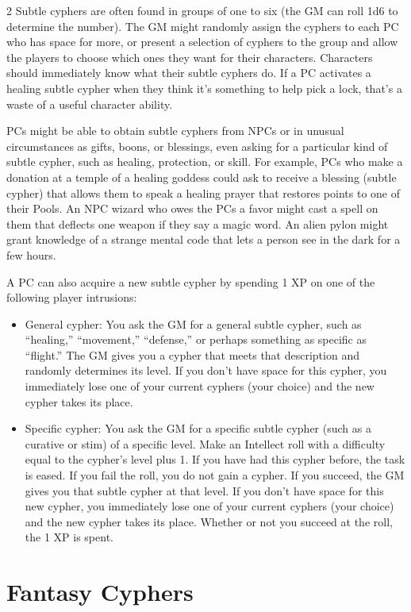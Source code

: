 \begin{multicols}{2}
Subtle cyphers are often found in groups of one to six (the GM can roll 1d6 to determine the number). The GM might randomly assign the cyphers to each PC who has space for more, or present a selection of cyphers to the group and allow the players to choose which ones they want for their characters. Characters should immediately know what their subtle cyphers do. If a PC activates a healing subtle cypher when they think it’s something to help pick a lock, that’s a waste of a useful character ability.

PCs might be able to obtain subtle cyphers from NPCs or in unusual circumstances as gifts, boons, or blessings, even asking for a particular kind of subtle cypher, such as healing, protection, or skill. For example, PCs who make a donation at a temple of a healing goddess could ask to receive a blessing (subtle cypher) that allows them to speak a healing prayer that restores points to one of their Pools. An NPC wizard who owes the PCs a favor might cast a spell on them that deflects one weapon if they say a magic word. An alien pylon might grant knowledge of a strange mental code that lets a person see in the dark for a few hours.

A PC can also acquire a new subtle cypher by spending 1 XP on one of the following player intrusions:

\begin{itemize}
\item General cypher: You ask the GM for a general subtle cypher, such as “healing,” “movement,” “defense,” or perhaps something as specific as “flight.” The GM gives you a cypher that meets that description and randomly determines its level. If you don’t have space for this cypher, you immediately lose one of your current cyphers (your choice) and the new cypher takes its place.

\item Specific cypher: You ask the GM for a specific subtle cypher (such as a curative or stim) of a specific level. Make an Intellect roll with a difficulty equal to the cypher’s level plus 1. If you have had this cypher before, the task is eased. If you fail the roll, you do not gain a cypher. If you succeed, the GM gives you that subtle cypher at that level. If you don’t have space for this new cypher, you immediately lose one of your current cyphers (your choice) and the new cypher takes its place. Whether or not you succeed at the roll, the 1 XP is spent.
\end{itemize}

\section{Fantasy Cyphers}


\end{multicols}
